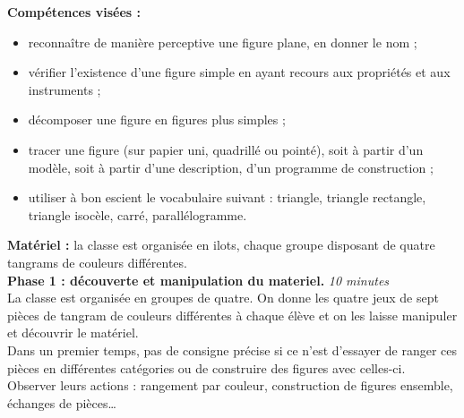 \begin{exercice*}
{\bf Compétences visées :}
\begin{itemize}
   \item reconnaître de manière perceptive une figure plane, en donner le nom ;
   \item vérifier l'existence d'une figure simple en ayant recours aux propriétés et aux instruments ;
   \item décomposer une figure en figures plus simples ;
   \item tracer une figure (sur papier uni, quadrillé ou pointé), soit à partir d’un modèle, soit à partir d’une description, d’un programme de construction ;
   \item utiliser à bon escient le vocabulaire suivant : triangle, triangle rectangle, triangle isocèle, carré, parallélogramme. \\
\end{itemize}

{\bf Matériel :} la classe est organisée en ilots, chaque groupe disposant de quatre tangrams de couleurs différentes. \\

{\bf Phase 1 : découverte et manipulation du materiel.} \hfill {\it10 minutes} \\
La classe est organisée en groupes de quatre. On donne les quatre jeux de sept pièces de tangram de couleurs différentes à chaque élève et on les laisse manipuler et découvrir le matériel. \\
Dans un premier temps, pas de consigne précise si ce n’est d'essayer de ranger ces pièces en différentes catégories ou de construire des figures avec celles-ci. \\
Observer leurs actions : rangement par couleur, construction de figures ensemble, échanges de pièces\dots \\


\end{exercice*}
